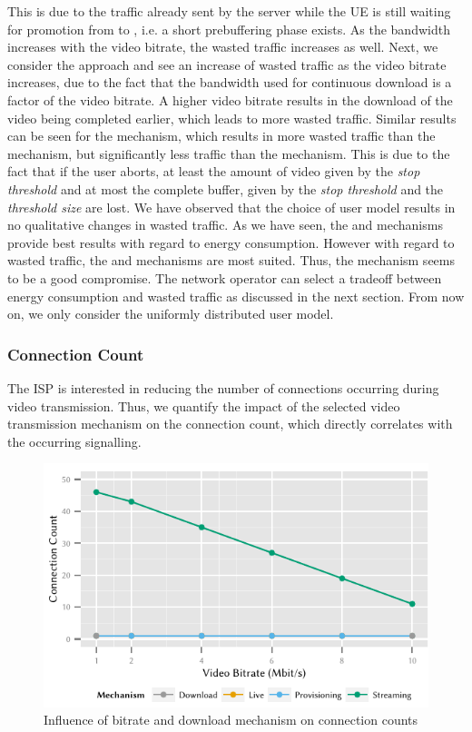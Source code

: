 This is due to the traffic already sent by the server while the \gls{UE} is still waiting for promotion from \rrcidle to \rrcconnected, i.e. a short prebuffering phase exists.
As the bandwidth increases with the video bitrate, the wasted traffic increases as well.
Next, we consider the \serviceprovisioning approach and see an increase of wasted traffic as the video bitrate increases, due to the fact that the bandwidth used for continuous download is a factor of the video bitrate.
A higher video bitrate results in the download of the video being completed earlier, which leads to more wasted traffic.
Similar results can be seen for the \streaming mechanism, which results in more wasted traffic than the \live mechanism, but significantly less traffic than the \serviceprovisioning mechanism.
This is due to the fact that if the user aborts, at least the amount of video given by the \emph{stop threshold} \bufferlower and at most the complete buffer, given by the \emph{stop threshold} and the \emph{threshold size} are lost.
We have observed that the choice of user model results in no qualitative changes in wasted traffic.
As we have seen, the \download and \streaming mechanisms provide best results with regard to energy consumption.
However with regard to wasted traffic, the \live and \streaming mechanisms are most suited.
Thus, the \streaming mechanism seems to be a good compromise.
The network operator can select a tradeoff between energy consumption and wasted traffic as discussed in the next section.
From now on, we only consider the uniformly distributed user model.

\subsubsection*{Connection Count}\label{sec:application:lte_video:connection_count}
The \gls{ISP} is interested in reducing the number of connections occurring during video transmission.
Thus, we quantify the impact of the selected video transmission mechanism on the connection count, which directly correlates with the occurring signalling.
\begin{figure}
  \centering
  \includegraphics{application/lte_video/numerical_evaluation/figures/bitrate2connections}
  \caption{Influence of bitrate and download mechanism on connection counts}
  \label{fig:application:lte_video:numerical_evaluation:energy_consumption:bitrate2connections}
\end{figure}

